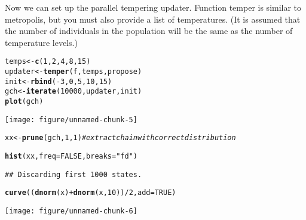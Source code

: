 \documentclass{article}\usepackage[]{graphicx}\usepackage[]{color}
\makeatletter
\def\maxwidth{ %
  \ifdim\Gin@nat@width>\linewidth
    \linewidth
  \else
    \Gin@nat@width
  \fi
}
\newcommand{\hlnum}[1]{\textcolor[rgb]{0.686,0.059,0.569}{#1}}%
\newcommand{\hlstr}[1]{\textcolor[rgb]{0.192,0.494,0.8}{#1}}%
\newcommand{\hlcom}[1]{\textcolor[rgb]{0.678,0.584,0.686}{\textit{#1}}}%
\newcommand{\hlopt}[1]{\textcolor[rgb]{0,0,0}{#1}}%
\newcommand{\hlstd}[1]{\textcolor[rgb]{0.345,0.345,0.345}{#1}}%
\newcommand{\hlkwb}[1]{\textcolor[rgb]{0.69,0.353,0.396}{#1}}%
\newcommand{\hlkwc}[1]{\textcolor[rgb]{0.333,0.667,0.333}{#1}}%
\newcommand{\hlkwd}[1]{\textcolor[rgb]{0.737,0.353,0.396}{\textbf{#1}}}%
\newenvironment{kframe}{%
 \def\at@end@of@kframe{}%
 \ifinner\ifhmode%
  \def\at@end@of@kframe{\end{minipage}}%
  \begin{minipage}{\columnwidth}%
 \fi\fi%
 \def\FrameCommand##1{\hskip\@totalleftmargin \hskip-\fboxsep
 \colorbox{shadecolor}{##1}\hskip-\fboxsep
     \hskip-\linewidth \hskip-\@totalleftmargin \hskip\columnwidth}%
 \MakeFramed {\advance\hsize-\width
   \@totalleftmargin\z@ \linewidth\hsize
   \@setminipage}}%
 {\par\unskip\endMakeFramed%
 \at@end@of@kframe}
\newenvironment{knitrout}{}{} %
\makeatother
\begin{document}
Now we can set up the parallel tempering updater. Function temper is similar to
metropolis, but you must also provide a list of temperatures. (It is
assumed that the number of individuals in the population will be the
same as the number of temperature levels.)
\begin{knitrout}
\color{fgcolor}\begin{kframe}
\begin{alltt}
\hlstd{temps} \hlkwb{<-} \hlkwd{c}\hlstd{(}\hlnum{1}\hlstd{,} \hlnum{2}\hlstd{,} \hlnum{4}\hlstd{,} \hlnum{8}\hlstd{,} \hlnum{15}\hlstd{)}
\hlstd{updater} \hlkwb{<-} \hlkwd{temper}\hlstd{(f, temps, propose)}
\hlstd{init} \hlkwb{<-} \hlkwd{rbind}\hlstd{(}\hlopt{-}\hlnum{3}\hlstd{,} \hlnum{0}\hlstd{,} \hlnum{5}\hlstd{,} \hlnum{10}\hlstd{,} \hlnum{15}\hlstd{)}
\hlstd{gch} \hlkwb{<-} \hlkwd{iterate}\hlstd{(}\hlnum{10000}\hlstd{, updater, init)}
\hlkwd{plot}\hlstd{(gch)}
\end{alltt}
\end{kframe}
\texttt{[image: figure/unnamed-chunk-5]} 
\begin{kframe}\begin{alltt}
\hlstd{xx} \hlkwb{<-} \hlkwd{prune}\hlstd{(gch,} \hlnum{1}\hlstd{,} \hlnum{1}\hlstd{)}  \hlcom{#extract chain with correct distribution}
\end{alltt}
\end{kframe}
\end{knitrout}

\begin{knitrout}
\color{fgcolor}\begin{kframe}
\begin{alltt}
\hlkwd{hist}\hlstd{(xx,} \hlkwc{freq} \hlstd{=} \hlnum{FALSE}\hlstd{,} \hlkwc{breaks} \hlstd{=} \hlstr{"fd"}\hlstd{)}
\end{alltt}
\begin{verbatim}
## Discarding first 1000 states.
\end{verbatim}
\begin{alltt}
\hlkwd{curve}\hlstd{((}\hlkwd{dnorm}\hlstd{(x)} \hlopt{+} \hlkwd{dnorm}\hlstd{(x,} \hlnum{10}\hlstd{))}\hlopt{/}\hlnum{2}\hlstd{,} \hlkwc{add} \hlstd{=} \hlnum{TRUE}\hlstd{)}
\end{alltt}
\end{kframe}
\texttt{[image: figure/unnamed-chunk-6]} 

\end{knitrout}
\end{document}
